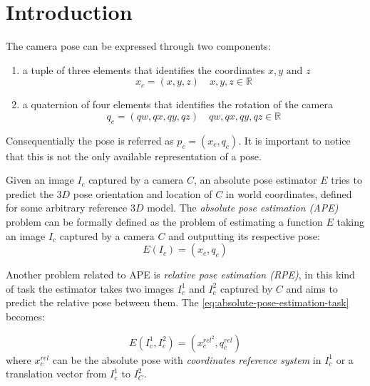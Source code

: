 \section{Introduction}
The camera pose can be expressed through two components:
\begin{enumerate}
    \item a tuple of three elements that identifies the coordinates $x,y\text{ and }z$
    \begin{equation}
        x_c=(x,y,z)\quad x,y,z \in \mathbb{R}  
        \label{eq:absolute-position-definition}
    \end{equation}
    \item a quaternion of four elements that identifies the rotation of the camera
    \begin{equation}
        q_c=(qw, qx, qy, qz)\quad qw,qx,qy,qz \in \mathbb{R}
        \label{eq:quaternion-as-rotation-definition}
    \end{equation}

\end{enumerate}
Consequentially the pose is referred as $p_c=(x_c, q_c)$. It is important to notice that this is not the only available representation of a pose.

Given an image $I_c$ captured by a camera $C$, an absolute pose estimator $E$ tries to predict the $3D$ pose orientation and location of $C$ in world coordinates, defined for some arbitrary reference $3D$ model. The \textit{absolute pose estimation (APE)} problem can be formally defined as the problem of estimating a function $E$ taking an image $I_c$ captured by a camera $C$ and outputting its respective pose:
\begin{equation}
    E(I_c) = (x_c, q_c)
    \label{eq:absolute-pose-estimation-task}
\end{equation}

Another problem related to APE is \textit{relative pose estimation (RPE)}, in this kind of task the estimator takes two images $I_c^1$ and $I_c^2$ captured by $C$ and aims to predict the relative pose between them. The \cref{eq:absolute-pose-estimation-task} becomes:

\begin{equation}
    E(I_c^1, I_c^2) = (x_c^{rel^2}, q_c^{rel})
    \label{eq:relative-pose-estimation-task}
\end{equation}
where $x_c^{rel}$ can be the absolute pose with \textit{coordinates reference system} in $I_c^1$ or a translation vector from $I_c^1$ to $I_C^2$.
